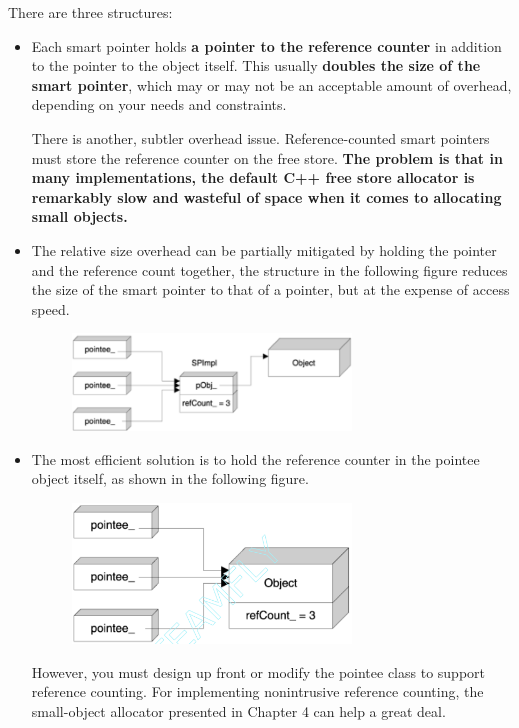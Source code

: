 There are three structures:
\begin{itemize}
\item Each smart pointer holds \textbf{a pointer to the
reference counter}  in addition to the pointer to the object
itself. This usually \textbf{doubles the size of the smart pointer},
which may or may not be an acceptable amount of overhead, depending on
your needs and constraints.

There is another, subtler overhead issue. Reference-counted smart
pointers must store the reference counter on the free
store. \textbf{The problem is that in many implementations, the
  default C++ free store allocator is remarkably slow and wasteful of
  space when it comes to allocating small objects.}
\item The relative size overhead can be partially mitigated by holding
  the pointer and the reference count together, the structure  in the
  following figure reduces
  the size of the smart pointer to that of a pointer, but at the
  expense of access speed.
  \begin{figure}[H]
    \centering
    \includegraphics[width=0.7\textwidth]{fig/refCounter2.png}
  \end{figure}
\item The most efficient solution is to hold the reference counter in
  the pointee object itself, as shown in the following figure.
   \begin{figure}[H]
    \centering
    \includegraphics[width=0.7\textwidth]{fig/refCounter3.png}
  \end{figure}
  
  However, you must design up front or modify the pointee class to
  support reference counting. For implementing nonintrusive reference
  counting, the small-object allocator presented in Chapter 4 can help
  a great deal. 
\end{itemize}

